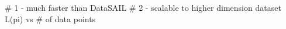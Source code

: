 # 1 - much faster than DataSAIL
# 2 - scalable to higher dimension dataset L(pi) vs # of data points